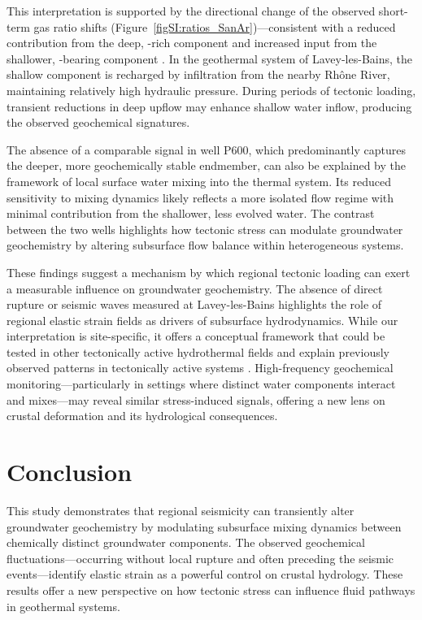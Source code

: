 This interpretation is supported by the directional change of the observed short-term gas ratio shifts (Figure~\ref{figSI:ratios_SanAr})---consistent with a reduced contribution from the deep, -rich component and increased input from the shallower, -bearing component \citep{giroud2025microbio}.
In the geothermal system of Lavey-les-Bains, the shallow component is recharged by infiltration from the nearby Rhône River, maintaining relatively high hydraulic pressure.
During periods of tectonic loading, transient reductions in deep upflow may enhance shallow water inflow, producing the observed geochemical signatures.

The absence of a comparable signal in well P600, which predominantly captures the deeper, more geochemically stable endmember, can also be explained by the framework of local surface water mixing into the thermal system.
Its reduced sensitivity to mixing dynamics likely reflects a more isolated flow regime with minimal contribution from the shallower, less evolved water.
The contrast between the two wells highlights how tectonic stress can modulate groundwater geochemistry by altering subsurface flow balance within heterogeneous systems.

These findings suggest a mechanism by which regional tectonic loading can exert a measurable influence on groundwater geochemistry.
The absence of direct rupture or seismic waves measured at Lavey-les-Bains highlights the role of regional elastic strain fields as drivers of subsurface hydrodynamics.
While our interpretation is site-specific, it offers a conceptual framework that could be tested in other tectonically active hydrothermal fields and explain previously observed patterns in tectonically active systems \citep{schilling2023revisiting}.
High-frequency geochemical monitoring---particularly in settings where distinct water components interact and mixes---may reveal similar stress-induced signals, offering a new lens on crustal deformation and its hydrological consequences.

\section{Conclusion}
This study demonstrates that regional seismicity can transiently alter groundwater geochemistry by modulating subsurface mixing dynamics between chemically distinct groundwater components.
The observed geochemical fluctuations---occurring without local rupture and often preceding the seismic events---identify elastic strain as a powerful control on crustal hydrology.
These results offer a new perspective on how tectonic stress can influence fluid pathways in geothermal systems.

